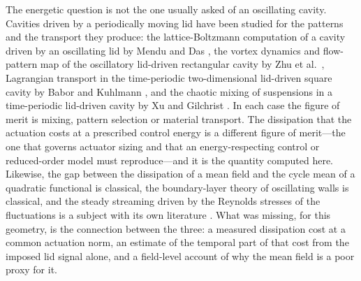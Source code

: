 \documentclass[11pt,a4paper]{article}
\begin{document}
The energetic question is not the one usually asked of an oscillating cavity.
Cavities driven by a periodically moving lid have been studied for the patterns and
the transport they produce: the lattice-Boltzmann computation of a cavity driven by
an oscillating lid by Mendu and Das \cite{mendu2013oscillating}, the vortex
dynamics and flow-pattern map of the oscillatory lid-driven rectangular cavity by
Zhu et al.~\cite{zhu2020oscillatory}, Lagrangian transport in the time-periodic
two-dimensional lid-driven square cavity by Babor and Kuhlmann
\cite{babor2023transport}, and the chaotic mixing of suspensions in a
time-periodic lid-driven cavity by Xu and Gilchrist \cite{xu2010mixing}. In each
case the figure of merit is mixing, pattern selection or material transport. The
dissipation that the actuation costs at a prescribed control energy is a different
figure of merit---the one that governs actuator sizing and that an
energy-respecting control or reduced-order model must reproduce---and it is the
quantity computed here. Likewise, the gap between the dissipation of a mean field
and the cycle mean of a quadratic functional is classical, the boundary-layer
theory of oscillating walls is classical, and the steady streaming driven by the
Reynolds stresses of the fluctuations is a subject with its own
literature \cite{riley2001streaming}. What was missing, for this geometry, is the
connection between the three: a measured dissipation cost at a common actuation
norm, an estimate of the temporal part of that cost from the imposed lid signal
alone, and a field-level account of why the mean field is a poor proxy for it.
\end{document}
